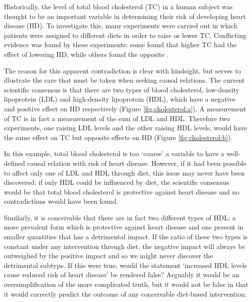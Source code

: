 

Historically, the level of total blood cholesterol (TC) in a human subject was thought to be an important variable in determining their risk of developing heart disease (HD).
To investigate this, many experiments were carried out in which patients were assigned to different diets in order to raise or lower TC\@.
Conflicting evidence was found by these experiments: some found that higher TC had the effect of lowering HD, while others found the opposite \citep{truswell2010cholesterol,steinberg2011cholesterol}.

The reason for this apparent contradiction is clear with hindsight, but serves to illustrate the care that must be taken when seeking causal relations. 
The current scientific consensus is that there are two types of blood cholesterol, low-density lipoprotein (LDL) and high-density lipoprotein (HDL), which have a negative and positive effect on HD respectively (Figure \ref{fig:cholesterol:a}).
A measurement of TC is in fact a measurement of the sum of LDL and HDL.
Therefore two experiments, one raising LDL levels and the other raising HDL levels, would have the same effect on TC but opposite effects on HD (Figure \ref{fig:cholesterol:b}).

In this example, total blood cholesterol is too `coarse' a variable to have a well-defined causal relation with risk of heart disease. 
However, if it had been possible to affect only one of LDL and HDL through diet, this issue may never have been discovered:
if only HDL could be influenced by diet, the scientific consensus would be that total blood cholesterol is protective against heart disease and no contradictions would have been found.

Similarly, it is conceivable that there are in fact two different types of HDL: a more prevalent form which is protective against heart disease and one present in smaller quantities that has a detrimental impact. 
If the ratio of these two types is constant under any intervention through diet, the negative impact will always be outweighed by the positive impact and so we might never discover the detrimental subtype. 
If this were true, would the statement `increased HDL levels cause reduced risk of heart disease' be rendered false? 
Arguably it would be an oversimplification of the more complicated truth, but it would not be false in that it would correctly predict the outcome of any conceivable diet-based intervention.


